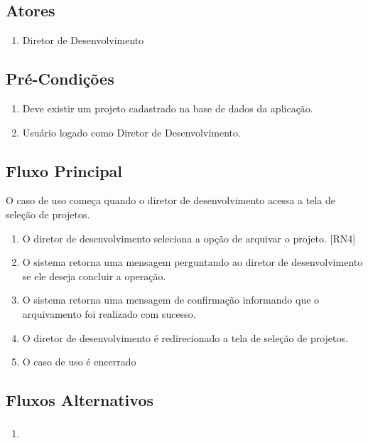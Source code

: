\subsection{Atores}

\begin{enumerate}
  \item Diretor de Desenvolvimento
\end{enumerate}

\subsection{Pré-Condições}
\begin{enumerate}
  \item Deve existir um projeto cadastrado na base de dados da aplicação.
  \item Usuário logado como Diretor de Desenvolvimento.
\end{enumerate}

\subsection{Fluxo Principal}
O caso de uso começa quando o diretor de desenvolvimento acessa a tela de seleção de projetos.

\begin{enumerate}
  \item O diretor de desenvolvimento seleciona a opção de arquivar o projeto. [RN4]
  \item O sistema retorna uma mensagem perguntando ao diretor de desenvolvimento se ele deseja concluir a operação.
  \item O sistema retorna uma mensagem de confirmação informando que o arquivamento foi realizado com sucesso.
  \item O diretor de desenvolvimento é redirecionado a tela de seleção de projetos.
  \item O caso de uso é encerrado
\end{enumerate}

\subsection{Fluxos Alternativos}

\subsubsection{}
\begin{enumerate}
  \item
\end{enumerate}

